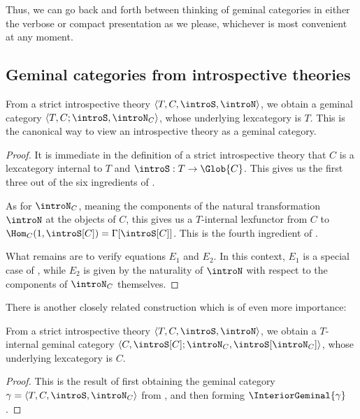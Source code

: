 Thus, we can go back and forth between thinking of geminal categories in either the verbose or compact presentation as we please, whichever is most convenient at any moment.

\subsection{Geminal categories from introspective theories}

\begin{construction}\label{IntrospAsGeminal}
From a strict introspective theory $\langle T, C, \introS, \introN \rangle$, we obtain a geminal category $\langle T, C; \introS, \introN_{C} \rangle$, whose underlying lexcategory is $T$. This is the canonical way to view an introspective theory as a geminal category.
\end{construction}
\begin{proof}
It is immediate in the definition of a strict introspective theory that $C$ is a lexcategory internal to $T$ and $\introS : T \to \Glob{C}$. This gives us the first three out of the six ingredients of .

As for $\introN_{C}$, meaning the components of the natural transformation $\introN$ at the objects of $C$, this gives us a $T$-internal lexfunctor from $C$ to $\Hom_C(1, \introS[C]) = \Gamma[\introS[C]]$. This is the fourth ingredient of .

What remains are to verify equations $E_1$ and $E_2$. In this context, $E_1$ is a special case of , while $E_2$ is given by the naturality of $\introN$ with respect to the components of $\introN_C$ themselves.
\end{proof}

There is another closely related construction which is of even more importance:

\begin{construction}\label{IntrospContainsGeminal}
From a strict introspective theory $\langle T, C, \introS, \introN \rangle$, we obtain a $T$-internal geminal category $\langle C, \introS[C]; \introN_{C}, \introS[\introN_{C}] \rangle$, whose underlying lexcategory is $C$.
\end{construction}
\begin{proof}
This is the result of first obtaining the geminal category $\gamma = \langle T, C, \introS, \introN_C \rangle$ from , and then forming $\InteriorGeminal{\gamma}$.
\end{proof}

